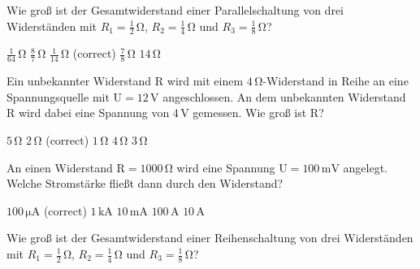 \documentclass[11pt]{exam}
\begin{document}
\setlength{\voffset}{-0.5in}
\setlength{\headsep}{5pt}

\hspace{2mm}
 \hspace{5mm}
\vspace{4mm}

\begin{questions}

\question Wie groß ist der Gesamtwiderstand einer Parallelschaltung von drei Widerständen mit \(R_1=\mathrm{\frac{1}{2}\,\Omega}\), \(R_2=\mathrm{\frac{1}{4}\,\Omega}\) und \(R_3=\mathrm{\frac{1}{8}\,\Omega}\)?

\begin{choices}
	\choice \(\mathrm{\frac{1}{64}\,\Omega}\)
	\choice \(\mathrm{\frac{8}{7}\,\Omega}\)
	\choice \(\mathrm{\frac{1}{14}\,\Omega}\) (correct)
	\choice \(\mathrm{\frac{7}{8}\,\Omega}\)
	\choice \(\mathrm{14\,\Omega}\)
\end{choices}

\vspace{3mm}\question Ein unbekannter Widerstand \(\mathrm{R}\) wird mit einem \(\mathrm{4\,\Omega}\)-Widerstand in Reihe an eine Spannungsquelle mit \(\mathrm{U=12\,V}\) angeschlossen. An dem unbekannten Widerstand \(\mathrm{R}\) wird dabei eine Spannung von \(\mathrm{4\,V}\) gemessen. Wie groß ist \(\mathrm{R}\)?

\begin{choices}
	\choice \(\mathrm{5\,\Omega}\)
	\choice \(\mathrm{2\,\Omega}\) (correct)
	\choice \(\mathrm{1\,\Omega}\)
	\choice \(\mathrm{4\,\Omega}\)
	\choice \(\mathrm{3\,\Omega}\)
\end{choices}

\vspace{3mm}\question An einen Widerstand \(\mathrm{R=1000\,\Omega}\) wird eine Spannung \(\mathrm{U=100\,mV}\) angelegt. Welche Stromstärke fließt dann durch den Widerstand?

\begin{choices}
	\choice \(\mathrm{100\,\mu A}\) (correct)
	\choice \(\mathrm{1\,kA}\)
	\choice \(\mathrm{10\,mA}\)
	\choice \(\mathrm{100\,A}\)
	\choice \(\mathrm{10\,A}\)
\end{choices}

\vspace{3mm}\question Wie groß ist der Gesamtwiderstand einer Reihenschaltung von drei Widerständen mit \(R_1=\mathrm{\frac{1}{2}\,\Omega}\), \(R_2=\mathrm{\frac{1}{4}\,\Omega}\) und \(R_3=\mathrm{\frac{1}{8}\,\Omega}\)?


\end{questions}
\end{document}
